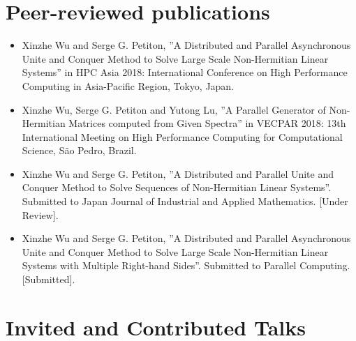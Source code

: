 \section*{Peer-reviewed publications}

\begin{itemize}
	\item Xinzhe Wu and Serge G. Petiton, ”A Distributed and Parallel Asynchronous Unite and Conquer Method to Solve Large Scale Non-Hermitian Linear Systems” in HPC Asia 2018: International Conference on High Performance Computing in Asia-Pacific Region, Tokyo, Japan. 
	\item Xinzhe Wu, Serge G. Petiton and Yutong Lu, ”A Parallel Generator of Non-Hermitian Matrices computed from Given Spectra” in VECPAR 2018: 13th International Meeting on High Performance Computing for Computational Science, S\~ao Pedro, Brazil.
	\item Xinzhe Wu and Serge G. Petiton, ”A Distributed and Parallel Unite and Conquer Method to Solve Sequences of Non-Hermitian Linear Systems”. Submitted to Japan Journal of Industrial and Applied Mathematics. [Under Review].
	\item Xinzhe Wu and Serge G. Petiton, ”A Distributed and Parallel Asynchronous Unite and Conquer Method to Solve Large Scale Non-Hermitian Linear Systems with Multiple Right-hand Sides”. Submitted to Parallel Computing. [Submitted].
\end{itemize}

\section*{Invited and Contributed Talks}

